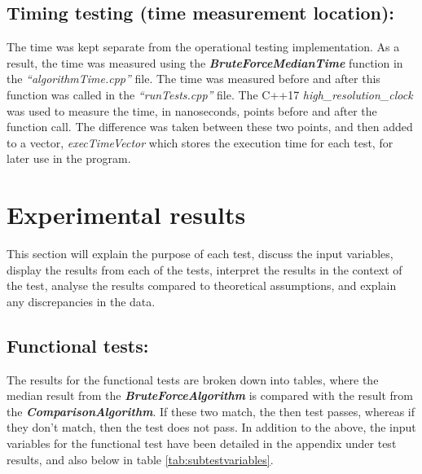 \documentclass[12pt]{article}
\begin{document}
\subsection{Timing testing (time measurement location):}
The time was kept separate from the operational testing implementation. As a result, the time was measured using the \textbf{\textit{BruteForceMedianTime}} function in the \textit{“algorithmTime.cpp”} file. The time was measured before and after this function was called in the \textit{“runTests.cpp”} file. The C++17 \textit{high\_resolution\_clock} was used to measure the time, in nanoseconds, points before and after the function call. The difference was taken between these two points, and then added to a vector, \textit{execTimeVector} which stores the execution time for each test, for later use in the program. 

\section{Experimental results}
This section will explain the purpose of each test, discuss the input variables, display the results from each of the tests, interpret the results in the context of the test, analyse the results compared to theoretical assumptions, and explain any discrepancies in the data. 

\subsection{Functional tests:}
The results for the functional tests are broken down into tables, where the median result from the \textbf{\textit{BruteForceAlgorithm}} is compared with the result from the \textbf{\textit{ComparisonAlgorithm}}. If these two match, the then test passes, whereas if they don't match, then the test does not pass. In addition to the above, the input variables for the functional test have been detailed in the appendix under test results, and also below in table \ref{tab:subtestvariables}.


\begin{table}[H]
	\centering
	\caption{These are the variables which are being used for all subtests under the functional test.}
	\label{tab:subtestvariables}
\end{table}
\end{document}
